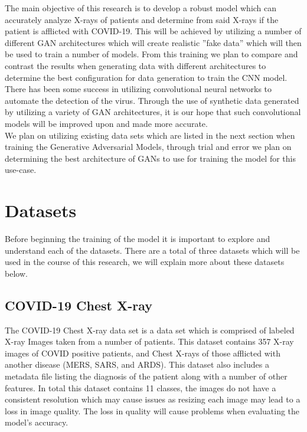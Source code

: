 \vspace{0.5mm}
The main objective of this research is to develop a robust model which can accurately analyze X-rays of patients and determine from said X-rays if the patient is afflicted with COVID-19.  This will be achieved by utilizing a number of different GAN architectures which will create realistic ''fake data'' which will then be used to train a number of models. From this training we plan to compare and contrast the results when generating data with different architectures to determine the best configuration for data generation to train the CNN model.  There has been some success in utilizing convolutional neural networks to automate the detection of the virus\cite{cnnCOVID19DetectionAhmed}\cite{cnnCOVID19DetectionLopez}.  Through the use of synthetic data generated by utilizing a variety of GAN architectures, it is our hope that such convolutional models will be improved upon and made more accurate.
\\
We plan on utilizing existing data sets which are listed in the next section when training the Generative Adversarial Models, through trial and error we plan on determining the best architecture of GANs to use for training the model for this use-case.
\section{Datasets}
Before beginning the training of the model it is important to explore and understand each of the datasets.  There are a total of three datasets which will be used in the course of this research, we will explain more about these datasets below.
\subsection{COVID-19 Chest X-ray}
The COVID-19 Chest X-ray data set is a data set which is comprised of labeled X-ray Images taken from a number of patients. This dataset contains 357 X-ray images of COVID positive patients, and Chest X-rays of those afflicted with another disease (MERS, SARS, and ARDS).  This dataset also includes a metadata file listing the diagnosis of the patient along with a number of other features\cite{xrayDataset}. In total this dataset contains 11 classes, the images do not have a consistent resolution which may cause issues as resizing each image may lead to a loss in image quality.  The loss in quality will cause problems when evaluating the model's accuracy.
\\
